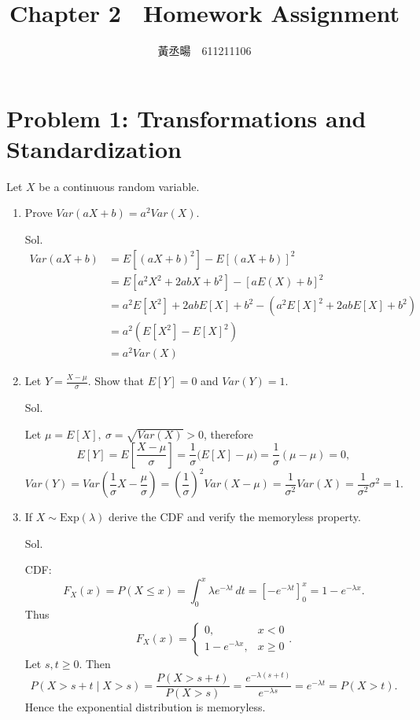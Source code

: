 \documentclass[a4paper, 12pt]{article}  %
\title{Chapter 2　Homework Assignment}
\author{黃丞暘　611211106}
\date{}
\begin{document}
\maketitle %

\section*{Problem 1: Transformations and Standardization}
Let $X$ be a continuous random variable.
    \begin{enumerate}
    \item Prove $Var(aX+b)=a^{2}Var(X)$.

    Sol.
    \begin{align*}
    Var(aX+b)
    &=E[(aX+b)^2]-E[(aX+b)]^2 \\
    &=E[a^2X^2+2abX+b^2]-[aE(X)+b]^2 \\
    &=a^2E[X^2]+2abE[X]+b^2-(a^2E[X]^2+2abE[X]+b^2) \\
    &=a^2(E[X^2]-E[X]^2) \\
    &=a^2Var(X)
    \end{align*}

    \item Let $Y=\frac{X-\mu}{\sigma}$. Show that ${E}[Y]=0$ and $Var(Y)=1$.

    Sol.

    Let $\mu=E[X],\ \sigma=\sqrt{Var(X)}>0$, therefore
    $$E[Y]=E\!\left[\frac{X-\mu}{\sigma}\right]=\frac{1}{\sigma}\big(E[X]-\mu\big)=\frac{1}{\sigma}(\mu-\mu)=0,$$
    $$Var(Y)=Var(\frac{1}{\sigma}X-\frac{\mu}{\sigma})=\left(\frac{1}{\sigma}\right)^2Var(X-\mu)=\frac{1}{\sigma^2}Var(X)=\frac{1}{\sigma^2}\sigma^2=1.$$

    \item If $X\sim \mathrm{Exp}(\lambda)$  derive the CDF and verify the memoryless property.

    Sol.

    CDF: $$F_X(x)=P(X\le x)=\int_{0}^{x}\lambda e^{-\lambda t}\,dt =\left[-e^{-\lambda t}\right]_{0}^{x}=1-e^{-\lambda x}.$$
    Thus
    $$
    F_X(x)=
    \begin{cases}
        0, & x<0 \\
        1-e^{-\lambda x}, & x\ge 0
    \end{cases}.
    $$
    Let $s,t\ge 0$. Then
    $$P(X>s+t\mid X>s)=\frac{P(X>s+t)}{P(X>s)}=\frac{e^{-\lambda(s+t)}}{e^{-\lambda s}}=e^{-\lambda t}=P(X>t).$$
    Hence the exponential distribution is memoryless.

    \end{enumerate}
\end{document}
